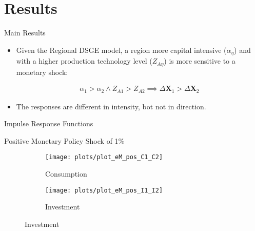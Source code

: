 \documentclass[../quali_slides.tex]{subfiles}
\begin{document}

\section{Results}


\begin{frame}{Main Results}
	
	\begin{itemize}
		
		\item Given the Regional DSGE model, a region more capital intensive ($\alpha_{\eta}$) and with a higher production technology level ($Z_{A\eta}$) is more sensitive to a monetary shock:
		
		\begin{align}
			\alpha_{1}>\alpha_{2} \land Z_{A1}>Z_{A2} \implies \Delta \mathbf{X}_{1} > \Delta \mathbf{X}_{2}
		\end{align}
		
		\item The responses are different in intensity, bot not in direction.
		
	\end{itemize}
	
\end{frame}


\begin{frame}{Impulse Response Functions}

\center Positive Monetary Policy Shock of 1\%

\begin{figure}[h!]
	\centering
	\begin{subfigure}[b]{0.45\textwidth}
		\centering
		\texttt{[image: plots/plot\_eM\_pos\_C1\_C2]}
		\caption{\scriptsize Consumption}
		\label{fig:plot_eM_pos_C1_C2}
	\end{subfigure}
	\hspace*{0.3cm}
	\begin{subfigure}[b]{0.45\textwidth}
		\centering
		\texttt{[image: plots/plot\_eM\_pos\_I1\_I2]}
		\caption{\scriptsize Investment}
		\label{fig:plot_eM_pos_I1_I2}
	\end{subfigure}
\end{figure}

\end{frame}
\end{document}
